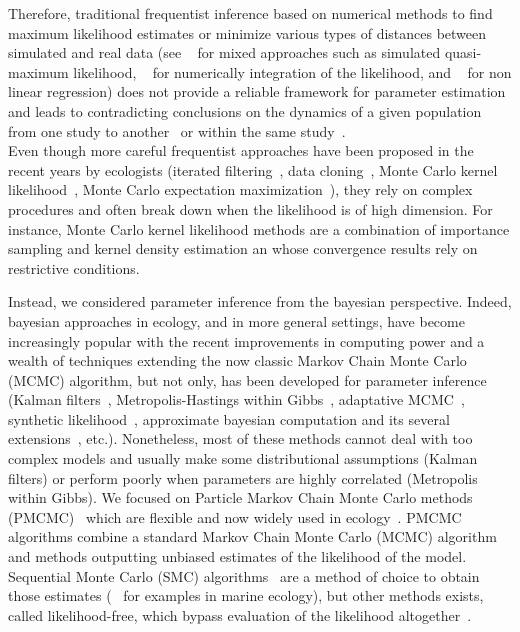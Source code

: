 \documentclass[12pt]{article}
\begin{document}
	Therefore, traditional frequentist inference based on numerical methods to find maximum likelihood estimates or minimize various types of distances between simulated and real data (see ~\cite{kendall1999populations,kendall2005population} for mixed approaches such as simulated quasi-maximum
	likelihood, ~\cite{de2002fitting} for numerically integration of the likelihood, and ~\cite{yang2008importance} for non linear regression) does not provide a reliable framework for parameter estimation and leads to contradicting conclusions on the dynamics of a given population from one study to another~\cite{sibly2005regulation, saether2002pattern} or within the same study~\cite{de2002fitting}. \\
	Even though more careful frequentist approaches have been proposed in the recent years by ecologists (iterated filtering~\cite{ionides2006inference}, data cloning~\cite{lele2007data}, Monte Carlo kernel likelihood~\cite{valpine2005state}, Monte Carlo
	expectation maximization~\cite{booth1999maximizing}), they rely on complex procedures and often break down when the likelihood is of high dimension. For instance, Monte Carlo kernel likelihood methods are a combination of importance sampling and kernel density estimation an whose convergence results rely on restrictive conditions.
	
	Instead, we considered parameter inference from the bayesian perspective. 
	Indeed, bayesian approaches in ecology, and in more general settings, have become increasingly popular with the recent improvements in computing power and a wealth of techniques extending the now classic Markov Chain Monte Carlo (MCMC) algorithm, but not only, has been developed for parameter inference (Kalman filters~\cite{sorenson1960kalman}, Metropolis-Hastings within Gibbs~\cite{geweke2001bayesian}, adaptative MCMC~\cite{Andrieu2008}, synthetic likelihood~\cite{wood2010statistical}, approximate bayesian computation and its several extensions~\cite{marin2012approximate}, etc.). Nonetheless, most of these methods cannot deal with too complex models and usually make some distributional assumptions (Kalman filters) or perform poorly when parameters are highly correlated (Metropolis within Gibbs). We focused on Particle Markov Chain Monte Carlo methods (PMCMC)~\cite{andrieu2010particle} which are flexible and now widely used in ecology~\cite{peters2010ecological, gao2012bayesian, fasiolo2014statistical}. PMCMC algorithms combine a standard Markov Chain Monte Carlo (MCMC) algorithm and methods outputting unbiased estimates of the likelihood of the model. Sequential Monte Carlo (SMC) algorithms~\cite{del2004feynman} are a method of choice to obtain those estimates (~\cite{losa2003sequential, dowd2006sequential, jones2010bayesian} for examples in marine ecology), but other methods exists, called likelihood-free, which bypass evaluation of the likelihood altogether~\cite{toni2009approximate}.
	
\end{document}
